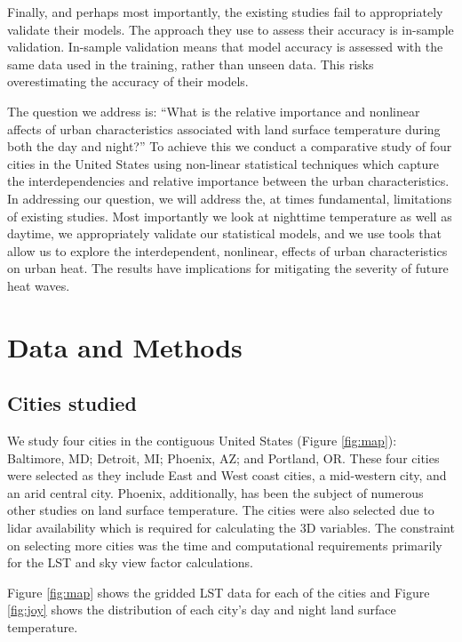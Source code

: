 \documentclass[final,3p,times,twocolumn,sort&compress]{elsarticle}
\begin{document}
Finally, and perhaps most importantly, the existing studies fail to appropriately validate their models.
The approach they use to assess their accuracy is in-sample validation.
In-sample validation means that model accuracy is assessed with the same data used in the training, rather than unseen data. 
This risks overestimating the accuracy of their models.

The question we address is: ``What is the relative importance and nonlinear affects of urban characteristics associated with land surface temperature during both the day and night?''
To achieve this we conduct a comparative study of four cities in the United States using non-linear statistical techniques which capture the interdependencies and relative importance between the urban characteristics.
In addressing our question, we will address the, at times fundamental, limitations of existing studies.
Most importantly we look at nighttime temperature as well as daytime, we appropriately validate our statistical models, and we use tools that allow us to explore the interdependent, nonlinear, effects of urban characteristics on urban heat.
The results have implications for mitigating the severity of future heat waves.

\section{Data and Methods}
\subsection{Cities studied}

We study four cities in the contiguous United States (Figure \ref{fig:map}): Baltimore, MD; Detroit, MI; Phoenix, AZ; and Portland, OR. These four cities were selected as they include East and West coast cities, a mid-western city, and an arid central city. Phoenix, additionally, has been the subject of numerous other studies on land surface temperature. The cities were also selected due to lidar availability which is required for calculating the 3D variables. The constraint on selecting more cities was the time and computational requirements primarily for the LST and sky view factor calculations. 

Figure \ref{fig:map} shows the gridded LST data for each of the cities and Figure \ref{fig:joy} shows the distribution of each city's day and night land surface temperature. 
\end{document}
